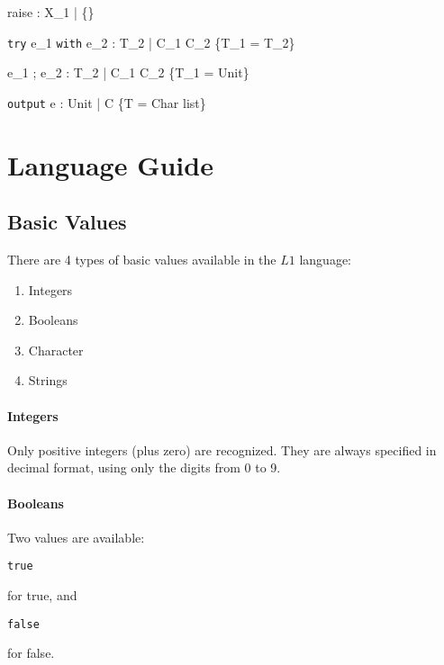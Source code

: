 \documentclass{article}
\def\code#1{\begin{footnotesize}\texttt{#1}\end{footnotesize}}
\begin{document}
\bigskip

    {\Gamma \vdash raise : X_1 \; | \; \{\}}

    {\Gamma \vdash \texttt{try} \; e_1 \; \texttt{with} \; e_2 : T_2 \; | \; C_1 \cup C_2 \cup \{T_1 = T_2\}}

\bigskip

    {\Gamma \vdash e_1 \; ; \; e_2 : T_2 \; | \; C_1 \cup C_2 \cup \{T_1 = \mbox{Unit}\}}

\bigskip

    {\Gamma \vdash \texttt{output} \; e : Unit \; | \; C \cup \{T = \mbox{Char} \; list\}}


\newpage

\section{Language Guide}

\subsection{Basic Values}

There are 4 types of basic values available in the $L1$ language:

\begin{enumerate}
  \item Integers
  \item Booleans
  \item Character
  \item Strings
\end{enumerate}

\paragraph{Integers}
Only positive integers (plus zero) are recognized.
They are always specified in decimal format,  using only the digits from 0 to 9.

\paragraph{Booleans}
Two values are available: \code{true} for true, and \code{false} for false.
\end{document}
